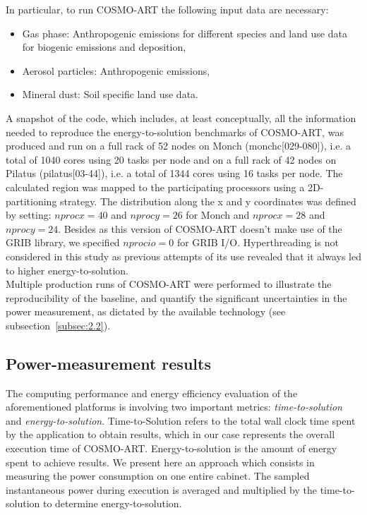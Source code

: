 \noindent
In  particular,  to  run   COSMO-ART  the  following  input  data  are
necessary:
\begin{itemize}
\item  Gas phase:  Anthropogenic emissions  for different  species and
  land use data for biogenic emissions and deposition,
\item Aerosol particles: Anthropogenic emissions,
\item Mineral dust: Soil specific land use data.
\end{itemize}

A snapshot of the code, which includes, at least conceptually, all the
information needed  to reproduce the  energy-to-solution benchmarks of
COSMO-ART, was  produced and run on a  full rack of 52  nodes on Monch
(monchc[029-080]), i.e.  a total of 1040 cores using 20 tasks per node
and on  a full rack of  42 nodes on Pilatus  (pilatus[03-44]), i.e.  a
total of  1344 cores using 16  tasks per node.   The calculated region
was  mapped to  the participating  processors using  a 2D-partitioning
strategy.  The distribution along the  x and y coordinates was defined
by setting: $nprocx=40$ and  $nprocy=26$ for Monch and $nprocx=28$ and
$nprocy=24$.  Besides as this version of COSMO-ART doesn't make use of
the   GRIB   library,  we   specified   $nprocio=0$   for  GRIB   I/O.
Hyperthreading is not considered in this study as previous attempts of
its use revealed that it always led to higher energy-to-solution.\\

Multiple production runs of COSMO-ART were performed to illustrate the
reproducibility  of   the  baseline,  and   quantify  the  significant
uncertainties in  the power measurement, as dictated  by the available
technology (see subsection~\ref{subsec:2.2}).

\subsection{Power-measurement results}
\label{subsec:3.3} 
The  computing performance  and  energy efficiency  evaluation of  the
aforementioned   platforms  is   involving   two  important   metrics:
\textit{time-to-solution}       and       \textit{energy-to-solution}.
Time-to-Solution  refers to  the total  wall clock  time spent  by the
application  to  obtain results,  which  in  our  case represents  the
overall execution time of  COSMO-ART. Energy-to-solution is the amount
of energy spent to achieve  results. We present here an approach which
consists  in measuring the  power consumption  on one  entire cabinet.
The  sampled  instantaneous power  during  execution  is averaged  and
multiplied by the time-to-solution to determine energy-to-solution.

